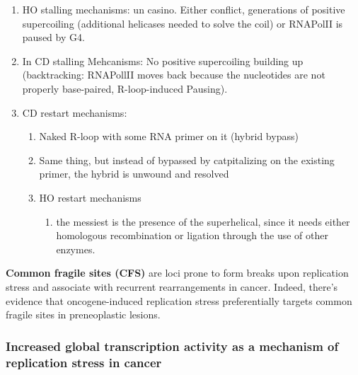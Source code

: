\begin{enumerate}
\def\labelenumi{\arabic{enumi}.}
\tightlist
\item
  HO stalling mechanisms: un casino. Either conflict, generations of
  positive supercoiling (additional helicases needed to solve the coil)
  or RNAPolII is paused by G4.
\item
  In CD stalling Mehcanisms: No positive supercoiling building up
  (backtracking: RNAPollII moves back because the nucleotides are not
  properly base-paired, R-loop-induced Pausing).
\item
  CD restart mechanisms:

  \begin{enumerate}
  \def\labelenumii{\arabic{enumii}.}
  \tightlist
  \item
    Naked R-loop with some RNA primer on it (hybrid bypass)
  \item
    Same thing, but instead of bypassed by catpitalizing on the existing
    primer, the hybrid is unwound and resolved
  \item
    HO restart mechanisms

    \begin{enumerate}
    \def\labelenumiii{\arabic{enumiii}.}
    \tightlist
    \item
      the messiest is the presence of the superhelical, since it needs
      either homologous recombination or ligation through the use of other
      enzymes.
    \end{enumerate}
  \end{enumerate}
\end{enumerate}

\textbf{Common fragile sites (CFS)} are loci prone to form breaks upon
replication stress and associate with recurrent rearrangements in
cancer. Indeed, there's evidence that oncogene-induced replication
stress preferentially targets common fragile sites in preneoplastic
lesions.

\hypertarget{increased-global-transcription-activity-as-a-mechanism-of-replication-stress-in-cancer}{%
\subsubsection{Increased global transcription activity as a mechanism of
replication stress in
cancer}\label{increased-global-transcription-activity-as-a-mechanism-of-replication-stress-in-cancer}}

